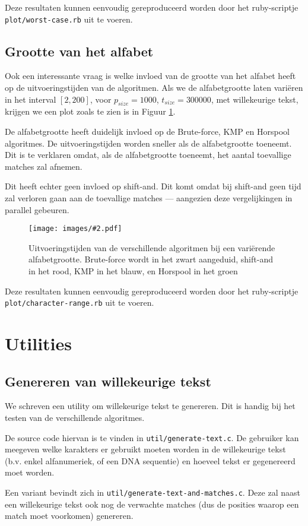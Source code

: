 \documentclass[a4paper,11pt]{article}
\newcommand{\image}[3][1]{
    \begin{figure}
    \begin{center}
    \texttt{[image: images/\#2.pdf]}
    \caption{#3}
    \label{fig:#2}
    \end{center}
    \end{figure}
}
\newcommand{\reproduce}[1]{
    Deze resultaten kunnen eenvoudig gereproduceerd worden door het
    ruby-scriptje \texttt{#1} uit te voeren.
}
\begin{document}
\reproduce{plot/worst-case.rb}

\subsection{Grootte van het alfabet}

Ook een interessante vraag is welke invloed van de grootte van het alfabet
heeft op de uitvoeringstijden van de algoritmen. Als we de alfabetgrootte laten
vari\"eren in het interval $[2, 200]$, voor $p_{size} = 1000$, $t_{size} =
300000$, met willekeurige tekst, krijgen we een plot zoals te zien is in Figuur
\ref{fig:plot-character-range}.

De alfabetgrootte heeft duidelijk invloed op de Brute-force, KMP en Horspool
algoritmes. De uitvoeringstijden worden sneller als de alfabetgrootte toeneemt.
Dit is te verklaren omdat, als de alfabetgrootte toeneemt, het aantal toevallige
matches zal afnemen.

Dit heeft echter geen invloed op shift-and. Dit komt omdat bij shift-and geen
tijd zal verloren gaan aan de toevallige matches — aangezien deze vergelijkingen
in parallel gebeuren.

\image{plot-character-range}{Uitvoeringstijden van de verschillende algoritmen
bij een vari\"erende alfabetgrootte. Brute-force wordt in het zwart aangeduid,
shift-and in het rood, KMP in het blauw, en Horspool in het groen}

\reproduce{plot/character-range.rb}

\section{Utilities}

\subsection{Genereren van willekeurige tekst}
\label{generate-text}

We schreven een utility om willekeurige tekst te genereren. Dit is handig bij
het testen van de verschillende algoritmes.

De source code hiervan is te vinden in \verb#util/generate-text.c#. De gebruiker
kan meegeven welke karakters er gebruikt moeten worden in de willekeurige tekst
(b.v. enkel alfanumeriek, of een DNA sequentie) en hoeveel tekst er gegenereerd
moet worden.

\label{generate-text-and-matches}
Een variant bevindt zich in \verb#util/generate-text-and-matches.c#. Deze zal
naast een willekeurige tekst ook nog de verwachte matches (dus de posities
waarop een match moet voorkomen) genereren.
\end{document}
